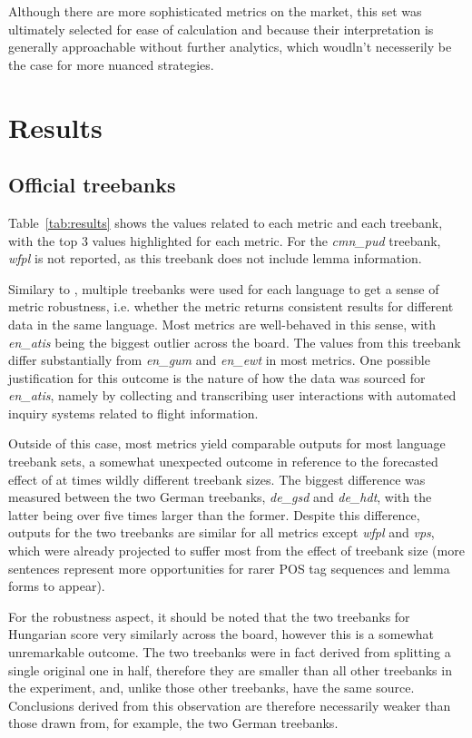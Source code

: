\documentclass[11pt]{article}
\begin{document}
Although there are more sophisticated metrics on the market, this set was ultimately selected for ease of calculation and because their interpretation is generally approachable without further analytics, which woudln't necesserily be the case for more nuanced strategies.


\section{Results}

\subsection{Official treebanks}



Table~\ref{tab:results} shows the values related to each metric and each treebank, with the top 3 values highlighted for each metric. For the \emph{cmn\_pud} treebank, \emph{wfpl} is not reported, as this treebank does not include lemma information.

Similary to \citep{berdicevskis-etal-2018-using}, multiple treebanks were used for each language to get a sense of metric robustness, i.e. whether the metric returns consistent results for different data in the same language. Most metrics are well-behaved in this sense, with \emph{en\_atis} being the biggest outlier across the board. The values from this treebank differ substantially from \emph{en\_gum} and \emph{en\_ewt} in most metrics. One possible justification for this outcome is the nature of how the data was sourced for \emph{en\_atis}, namely by collecting and transcribing user interactions with automated inquiry systems related to flight information. 

Outside of this case, most metrics yield comparable outputs for most language treebank sets, a somewhat unexpected outcome in reference to the forecasted effect of at times wildly different treebank sizes. The biggest difference was measured between the two German treebanks, \emph{de\_gsd} and \emph{de\_hdt}, with the latter being over five times larger than the former. Despite this difference, outputs for the two treebanks are similar for all metrics except \emph{wfpl} and \emph{vps}, which were already projected to suffer most from the effect of treebank size (more sentences represent more opportunities for rarer POS tag sequences and lemma forms to appear).

For the robustness aspect, it should be noted that the two treebanks for Hungarian score very similarly across the board, however this is a somewhat unremarkable outcome. The two treebanks were in fact derived from splitting a single original one in half, therefore they are smaller than all other treebanks in the experiment, and, unlike those other treebanks, have the same source. Conclusions derived from this observation are therefore necessarily weaker than those drawn from, for example, the two German treebanks.
\end{document}

